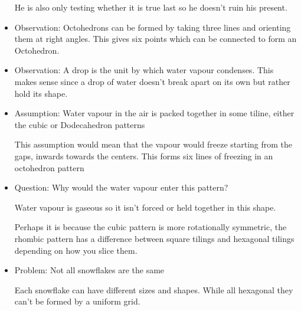 \documentclass{report}
\begin{document}
\begin{itemize}
\begin{mdframed}
            He is also only testing whether it is true last
            so he doesn't ruin his present.
        \end{mdframed}
    \item Observation: Octohedrons can be formed by taking
        three lines and orienting them at right angles.
        This gives six points which can be connected to
        form an Octohedron.
    \item Observation: A drop is the unit by which
        water vapour condenses. This makes sense since
        a drop of water doesn't break apart on its
        own but rather hold its shape.
    \item Assumption: Water vapour in the air is packed
        together in some tiline, either the cubic or
        Dodecahedron patterns
        \begin{mdframed}
            This assumption would mean that the vapour would
            freeze starting from the gaps, inwards towards
            the centers. This forms six lines of freezing
            in an octohedron pattern
        \end{mdframed}
    \item Question: Why would the water vapour enter this
        pattern?
        \begin{mdframed}
            Water vapour is gaseous so it isn't forced
            or held together in this shape.

            Perhaps it is because the cubic pattern is more
            rotationally symmetric, the rhombic pattern
            has a difference between square tilings
            and hexagonal tilings depending on how
            you slice them.
        \end{mdframed}
    \item Problem: Not all snowflakes are the same
        \begin{mdframed}
            Each snowflake can have different sizes and
            shapes. While all hexagonal they can't be
            formed by a uniform grid.


\end{mdframed}
\end{itemize}
\end{document}
